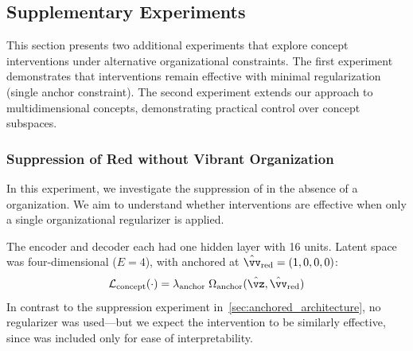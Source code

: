 
\subsection{Supplementary Experiments}
\label{sec:additional_experiments}

This section presents two additional experiments that explore concept interventions under alternative organizational constraints. The first experiment demonstrates that interventions remain effective with minimal regularization (single anchor constraint). The second experiment extends our approach to multidimensional concepts, demonstrating practical control over concept subspaces.

\subsubsection{Suppression of Red without Vibrant Organization}
\label{sec:suppression-no-vibrant}

In this experiment, we investigate the suppression of  in the absence of a  organization. We aim to understand whether interventions are effective when only a single organizational regularizer is applied.

The encoder and decoder each had one hidden layer with 16 units. Latent space was four-dimensional ($E = 4$), with  anchored at $\hat{\vv}_{\text{red}} = (1,0,0,0)$:
%
\begin{equation}
    \mathcal{L}_{\text{concept}}(\cdot) = \lambda_{\text{anchor}} \; \Omega_{\text{anchor}}(\hat{\vz},\hat{\vv}_\text{red})
\end{equation}
%
In contrast to the suppression experiment in~\cref{sec:anchored_architecture}, no  regularizer was used---but we expect the intervention to be similarly effective, since  was included only for ease of interpretability.

